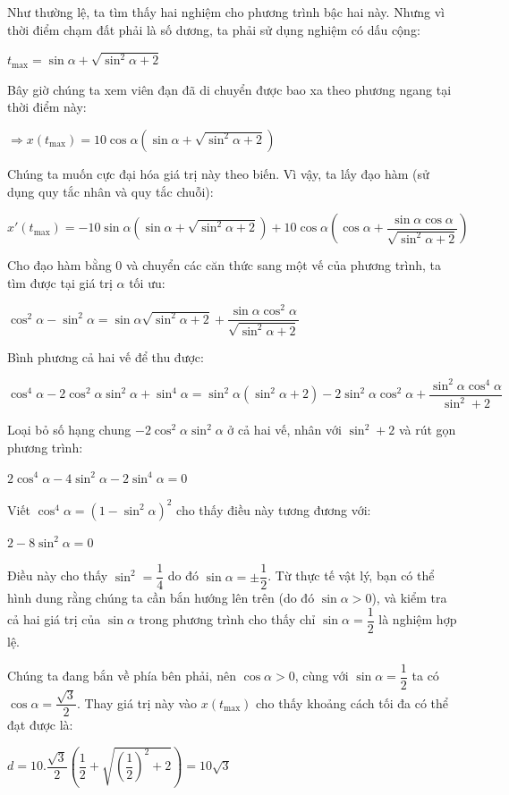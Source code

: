 \documentclass[12pt,a4paper]{article}
\begin{document}
\begin{itemize}
    Như thường lệ, ta tìm thấy hai nghiệm cho phương trình bậc hai này. Nhưng vì thời điểm chạm đất phải là số dương, ta phải sử dụng nghiệm có dấu cộng:

    $t_{\max} = \sin \alpha + \sqrt{\sin ^2 \alpha + 2}$
    
    Bây giờ chúng ta xem viên đạn đã di chuyển được bao xa theo phương ngang tại thời điểm này:

    $\Rightarrow x(t_{\max}) = 10 \cos \alpha(\sin \alpha + \sqrt{\sin ^2 \alpha + 2})$
    
    Chúng ta muốn cực đại hóa giá trị này theo biến. Vì vậy, ta lấy đạo hàm (sử dụng quy tắc nhân và quy tắc chuỗi):

    $x'(t_{\max}) = -10\sin \alpha (\sin \alpha + \sqrt{\sin ^2 \alpha + 2}) + 10 \cos \alpha (\cos \alpha + \dfrac{\sin \alpha \cos \alpha}{\sqrt{\sin ^2 \alpha + 2}})$
    
    Cho đạo hàm bằng 0 và chuyển các căn thức sang một vế của phương trình, ta tìm được tại giá trị $\alpha$ tối ưu:

    $\cos^2\alpha-\sin^2\alpha = \sin \alpha \sqrt{\sin ^2 \alpha + 2} + \dfrac{\sin \alpha \cos^2 \alpha}{\sqrt{\sin ^2 \alpha + 2}}$
    
    Bình phương cả hai vế để thu được:

    $\cos^4 \alpha - 2\cos^2\alpha\sin^2\alpha +\sin^4\alpha = \sin^2\alpha(\sin^2\alpha + 2) - 2\sin^2\alpha\cos^2\alpha + \dfrac{\sin^2\alpha\cos^4\alpha}{\sin^2 + 2}$
    
    Loại bỏ số hạng chung $- 2\cos^2\alpha\sin^2\alpha$ ở cả hai vế, nhân với $\sin^2 + 2$ và rút gọn phương trình:

    $2\cos^4\alpha - 4\sin^2\alpha - 2\sin^4\alpha = 0$
    
    Viết $\cos^4\alpha = (1 - \sin^2\alpha)^2$ cho thấy điều này tương đương với:

    $2 - 8\sin^2\alpha = 0$
    
    Điều này cho thấy $\sin^2 = \dfrac{1}{4}$ do đó $\sin \alpha = \pm\dfrac{1}{2}$. Từ thực tế vật lý, bạn có thể hình dung rằng chúng ta cần bắn hướng lên trên (do đó $\sin \alpha > 0$), và kiểm tra cả hai giá trị của $\sin \alpha$ trong phương trình cho thấy chỉ $\sin \alpha = \dfrac{1}{2}$ là nghiệm hợp lệ.
    
    Chúng ta đang bắn về phía bên phải, nên $\cos \alpha > 0$, cùng với $\sin \alpha = \dfrac{1}{2}$ ta có $\cos \alpha = \dfrac{\sqrt{3}}{2}$. Thay giá trị này vào $x(t_{\max})$ cho thấy khoảng cách tối đa có thể đạt được là:

    $d = 10.\dfrac{\sqrt{3}}{2}(\dfrac{1}{2} + \sqrt{(\dfrac{1}{2})^2 + 2}) = 10\sqrt{3}$
\end{itemize}
\end{document}
